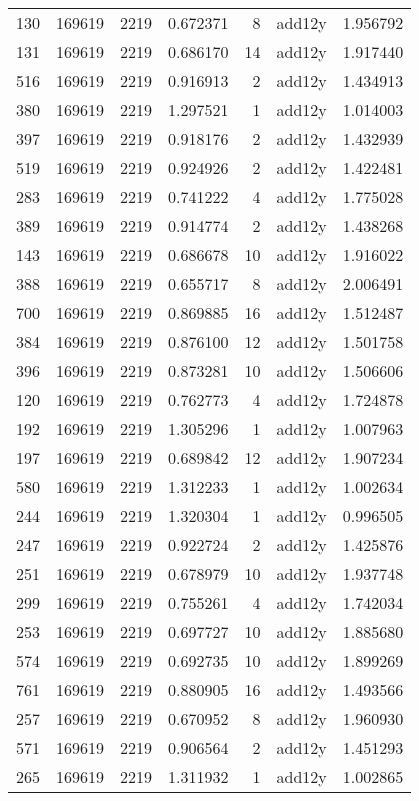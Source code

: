 \begin{tabular}{lrrrrlr}
130 & 169619 & 2219 & 0.672371 & 8 & add12y & 1.956792 \\
131 & 169619 & 2219 & 0.686170 & 14 & add12y & 1.917440 \\
516 & 169619 & 2219 & 0.916913 & 2 & add12y & 1.434913 \\
380 & 169619 & 2219 & 1.297521 & 1 & add12y & 1.014003 \\
397 & 169619 & 2219 & 0.918176 & 2 & add12y & 1.432939 \\
519 & 169619 & 2219 & 0.924926 & 2 & add12y & 1.422481 \\
283 & 169619 & 2219 & 0.741222 & 4 & add12y & 1.775028 \\
389 & 169619 & 2219 & 0.914774 & 2 & add12y & 1.438268 \\
143 & 169619 & 2219 & 0.686678 & 10 & add12y & 1.916022 \\
388 & 169619 & 2219 & 0.655717 & 8 & add12y & 2.006491 \\
700 & 169619 & 2219 & 0.869885 & 16 & add12y & 1.512487 \\
384 & 169619 & 2219 & 0.876100 & 12 & add12y & 1.501758 \\
396 & 169619 & 2219 & 0.873281 & 10 & add12y & 1.506606 \\
120 & 169619 & 2219 & 0.762773 & 4 & add12y & 1.724878 \\
192 & 169619 & 2219 & 1.305296 & 1 & add12y & 1.007963 \\
197 & 169619 & 2219 & 0.689842 & 12 & add12y & 1.907234 \\
580 & 169619 & 2219 & 1.312233 & 1 & add12y & 1.002634 \\
244 & 169619 & 2219 & 1.320304 & 1 & add12y & 0.996505 \\
247 & 169619 & 2219 & 0.922724 & 2 & add12y & 1.425876 \\
251 & 169619 & 2219 & 0.678979 & 10 & add12y & 1.937748 \\
299 & 169619 & 2219 & 0.755261 & 4 & add12y & 1.742034 \\
253 & 169619 & 2219 & 0.697727 & 10 & add12y & 1.885680 \\
574 & 169619 & 2219 & 0.692735 & 10 & add12y & 1.899269 \\
761 & 169619 & 2219 & 0.880905 & 16 & add12y & 1.493566 \\
257 & 169619 & 2219 & 0.670952 & 8 & add12y & 1.960930 \\
571 & 169619 & 2219 & 0.906564 & 2 & add12y & 1.451293 \\
265 & 169619 & 2219 & 1.311932 & 1 & add12y & 1.002865 \\

\end{tabular}
